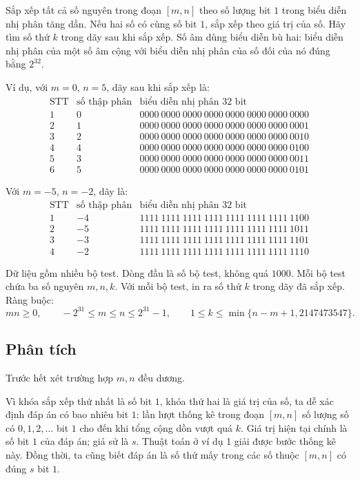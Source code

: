 \documentclass[11pt]{article}
\begin{document}
Sắp xếp tất cả số nguyên trong đoạn $[m,n]$ theo số lượng bit $1$ trong biểu
diễn nhị phân tăng dần. Nếu hai số có cùng số bit $1$, sắp xếp theo giá trị
của số. Hãy tìm số thứ $k$ trong dãy sau khi sắp xếp. Số âm dùng biểu diễn bù
hai: biểu diễn nhị phân của một số âm cộng với biểu diễn nhị phân của số đối
của nó đúng bằng $2^{32}$.

Ví dụ, với $m=0$, $n=5$, dãy sau khi sắp xếp là:
\[
\begin{array}{c|r|l}
\text{STT} & \text{số thập phân} & \text{biểu diễn nhị phân 32 bit}\\
\hline
1&0&0000\ 0000\ 0000\ 0000\ 0000\ 0000\ 0000\ 0000\\
2&1&0000\ 0000\ 0000\ 0000\ 0000\ 0000\ 0000\ 0001\\
3&2&0000\ 0000\ 0000\ 0000\ 0000\ 0000\ 0000\ 0010\\
4&4&0000\ 0000\ 0000\ 0000\ 0000\ 0000\ 0000\ 0100\\
5&3&0000\ 0000\ 0000\ 0000\ 0000\ 0000\ 0000\ 0011\\
6&5&0000\ 0000\ 0000\ 0000\ 0000\ 0000\ 0000\ 0101
\end{array}
\]

Với $m=-5$, $n=-2$, dãy là:
\[
\begin{array}{c|r|l}
\text{STT} & \text{số thập phân} & \text{biểu diễn nhị phân 32 bit}\\
\hline
1&-4&1111\ 1111\ 1111\ 1111\ 1111\ 1111\ 1111\ 1100\\
2&-5&1111\ 1111\ 1111\ 1111\ 1111\ 1111\ 1111\ 1011\\
3&-3&1111\ 1111\ 1111\ 1111\ 1111\ 1111\ 1111\ 1101\\
4&-2&1111\ 1111\ 1111\ 1111\ 1111\ 1111\ 1111\ 1110
\end{array}
\]

Dữ liệu gồm nhiều bộ test. Dòng đầu là số bộ test, không quá $1000$. Mỗi bộ
test chứa ba số nguyên $m,n,k$. Với mỗi bộ test, in ra số thứ $k$ trong dãy đã
sắp xếp. Ràng buộc:
\[
  mn\ge 0,\qquad
  -2^{31}\le m\le n\le 2^{31}-1,\qquad
  1\le k\le \min\{n-m+1,2147473547\}.
\]

\subsection{Phân tích}

Trước hết xét trường hợp $m,n$ đều dương.

Vì khóa sắp xếp thứ nhất là số bit $1$, khóa thứ hai là giá trị của số, ta dễ
xác định đáp án có bao nhiêu bit $1$: lần lượt thống kê trong đoạn $[m,n]$ số
lượng số có $0,1,2,\ldots$ bit $1$ cho đến khi tổng cộng dồn vượt quá $k$.
Giá trị hiện tại chính là số bit $1$ của đáp án; giả sử là $s$. Thuật toán ở
ví dụ 1 giải được bước thống kê này. Đồng thời, ta cũng biết đáp án là số thứ
mấy trong các số thuộc $[m,n]$ có đúng $s$ bit $1$.
\end{document}
